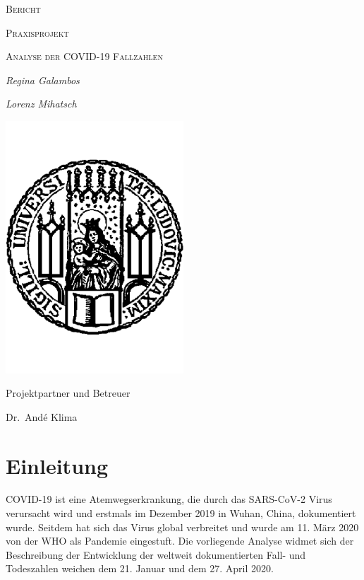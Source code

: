 \documentclass[12pt, a4paper]{article}
\begin{document}

\begin{titlepage}
	\centering
	{\scshape\Large Bericht \par}
	\vspace{0.5cm}
	{\scshape Praxisprojekt \par}
	\vspace{1.0cm}
	{\scshape\LARGE Analyse der COVID-19 Fallzahlen
 \par}
 	\vspace{2cm}
	{\Large\itshape Regina Galambos\par}
	{\Large\itshape Lorenz Mihatsch\par}
	\vspace{2cm}

	\includegraphics[width=0.5\textwidth]{LMU.pdf}\\


	\vspace{1cm}
	{Projektpartner und Betreuer\par
	 Dr.\ And\'{e} Klima\par}
\end{titlepage}

\section{Einleitung}
COVID-19 ist eine Atemwegserkrankung, die durch das SARS-CoV-2 Virus verursacht wird und erstmals im Dezember 2019 in Wuhan, China, dokumentiert wurde. Seitdem hat sich das Virus global verbreitet und wurde am 11. März 2020 von der WHO als Pandemie eingestuft. Die vorliegende Analyse widmet sich der Beschreibung der Entwicklung der weltweit dokumentierten Fall- und Todeszahlen weichen dem 21. Januar und dem 27. April 2020.
\end{document}
